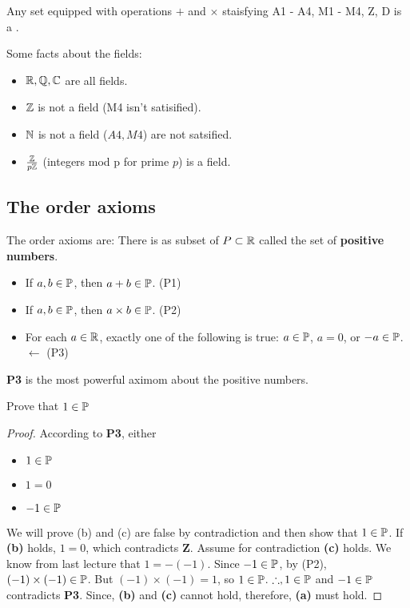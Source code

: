 \documentclass[11pt]{article}
\begin{document}
\begin{definition}
	Any set equipped with operations \(+\) and \(\times\) staisfying A1 - A4, M1 - M4, Z, D is a .
\end{definition}
\begin{fact}
	Some facts about the fields:

	\begin{itemize}
		\item \(\mathbb R, \mathbb Q, \mathbb C\) are all fields.
		\item \(\mathbb Z\) is not a field (M4 isn't satisified).
		\item \(\mathbb N\) is not a field (\(A4, M4\)) are not satsified.
		\item \(\frac{\mathbb Z}{p\mathbb Z}\) (integers mod p for prime \(p\)) is a field.
	\end{itemize}
\end{fact}

\subsection{The order axioms}
The order axioms are: There is as subset of \(P \subset \mathbb R\) called the set of
\textbf{positive numbers}.
\begin{itemize}
	\item If \(a, b \in \mathbb P\), then \(a + b \in \mathbb P\). \hfill (P1)
	\item If \(a, b \in \mathbb P\), then \(a \times b \in \mathbb P\). \hfill (P2)
	\item For each \(a \in \mathbb R\), exactly one of the following is true: \(a \in \mathbb P\),
	      \(a = 0\), or \(-a \in \mathbb P\). \(\leftarrow\) \hfill
	      (P3)
\end{itemize}
\textbf{P3} is the most powerful aximom about the positive numbers.
\begin{proposition}
	Prove that \(1 \in \mathbb P\)
\end{proposition}
\begin{proof}
	According to \textbf{P3}, either
	\begin{itemize}
		\item \(1 \in \mathbb P\)
		\item \(1 = 0\)
		\item \(-1 \in \mathbb P\)
	\end{itemize}
	We will prove (b) and (c) are false by contradiction and then show that \(1 \in \mathbb P\).
	If \textbf{(b)} holds, \(1 = 0\), which contradicts \textbf{Z}.
	Assume for contradiction \textbf{(c)} holds. We know from last lecture that \(1 = -(-1)\). Since \(-1 \in \mathbb P\), by (P2), \((-1) \times (-1) \in \mathbb P\). But \((-1) \times (-1) = 1\), so \(1 \in \mathbb P\).
	\(\therefore, 1 \in \mathbb P\) and \(-1 \in \mathbb P\) contradicts \textbf{P3}.
	Since, \textbf{(b)} and \textbf{(c)} cannot hold, therefore, \textbf{(a)} must hold.
\end{proof}
\end{document}
